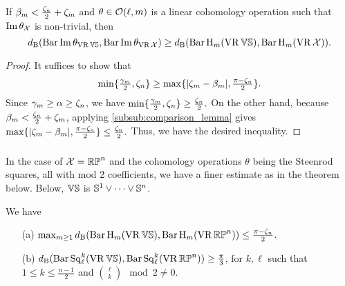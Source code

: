 \medskip\proposition
If $\beta_\degp < \tfrac{\zeta_n}{2}+\zeta_\degp$ and $\theta \in \cO(\ell, \degp)$ is a linear cohomology operation such that $\img \theta_\cX$ is non-trivial, then
\[\db(\thetabarc{\VS}, \thetabarc{\cX}) \geq \db(\Hbarc[\field]{\degp}{\VS}, \Hbarc[\field]{\degp}{\cX}).\]

\begin{proof}
        It suffices to show that
        \[
        \min\{\tfrac{\gamma_\degp}{2}, \zeta_n\} \geq \max\{|\zeta_\degp - \beta_\degp|, \tfrac{\pi - \zeta_n}{2}\}.
        \]
        Since \(\gamma_\degp \geq \alpha \geq \zeta_n\), we have
        \(
        \min\{\tfrac{\gamma_\degp}{2}, \zeta_n\} \geq \tfrac{\zeta_n}{2}.
        \)
        On the other hand, because \(\beta_\degp < \tfrac{\zeta_n}{2} + \zeta_\degp\), applying \cref{subsub:comparison_lemma} gives
        \(
        \max\{|\zeta_\degp - \beta_\degp|, \tfrac{\pi - \zeta_n}{2}\} \leq \tfrac{\zeta_n}{2}.
        \)
        Thus, we have the desired inequality.
\end{proof}

\subsubsection{}

In the case of $\cX = \rp^n$ and the cohomology operations $\theta$ being the Steenrod squares, all with mod $2$ coefficients, we have a finer estimate as in the theorem below.
Below, $\VS$ is $\bS^1\vee\dots\vee \bS^n$.

\medskip\theorem
We have
\begin{itemize}
	\item[(a)] $\max_{\degp\geq 1}\db(\Hbarc{\degp}{\VS}, \Hbarc{\degp}{\rp^n})\leq \tfrac{\pi - \zeta_n}{2}$.
	\smallskip\item[(b)] $\db(\sqbarcl{k}{\ell}{\VS}, \sqbarcl{k}{\ell}{\rp^n})\geq \tfrac{\pi}{3}$, for $k,\ell$ such that $1\leq k \leq \frac{n-1}{2}$ and $\binom{\ell}{k} \mod 2 \neq 0$.
\end{itemize}

